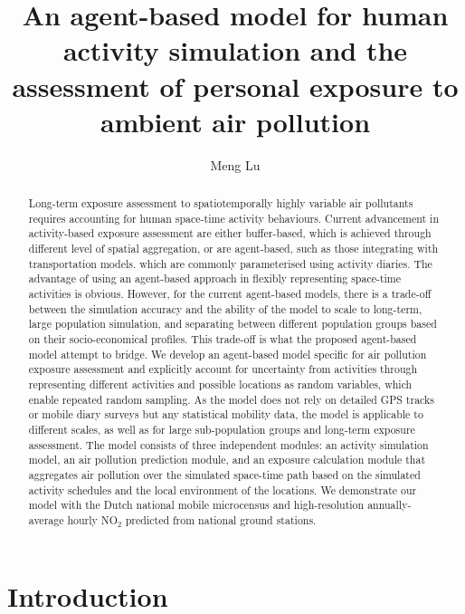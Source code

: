 \documentclass[]{article}
\author{Meng Lu }
\title{An agent-based model for human activity simulation and the assessment of personal exposure to ambient air pollution}
\begin{document}
\maketitle
\begin{abstract}
 
 Long-term exposure assessment to spatiotemporally highly variable air pollutants requires accounting for human space-time activity behaviours. Current advancement in activity-based exposure assessment are either buffer-based, which is achieved through different level of spatial aggregation, or are agent-based, such as those integrating with transportation models. which are commonly parameterised using activity diaries. The advantage of using an agent-based approach in flexibly representing space-time activities is obvious. However, for the current agent-based models, there is a trade-off between the simulation accuracy and the ability of the model to scale to long-term, large population simulation, and separating between different population groups based on their socio-economical profiles. This trade-off is what the proposed agent-based model attempt to bridge. We develop an agent-based model specific for air pollution exposure assessment and explicitly account for uncertainty from activities through representing different activities and possible locations as random variables, which enable repeated random sampling. As the model does not rely on detailed GPS tracks or mobile diary surveys but any statistical mobility data, the model is applicable to different scales, as well as for large sub-population groups and long-term exposure assessment. The model consists of three independent modules: an activity simulation model, an air pollution prediction module, and an exposure calculation module that aggregates air pollution over the simulated space-time path based on the simulated activity schedules and the local environment of the locations. We demonstrate our model with the Dutch national mobile microcensus and high-resolution annually-average hourly NO$_2$ predicted from national ground stations. 

\end{abstract}

 
\section{Introduction}
\end{document}
